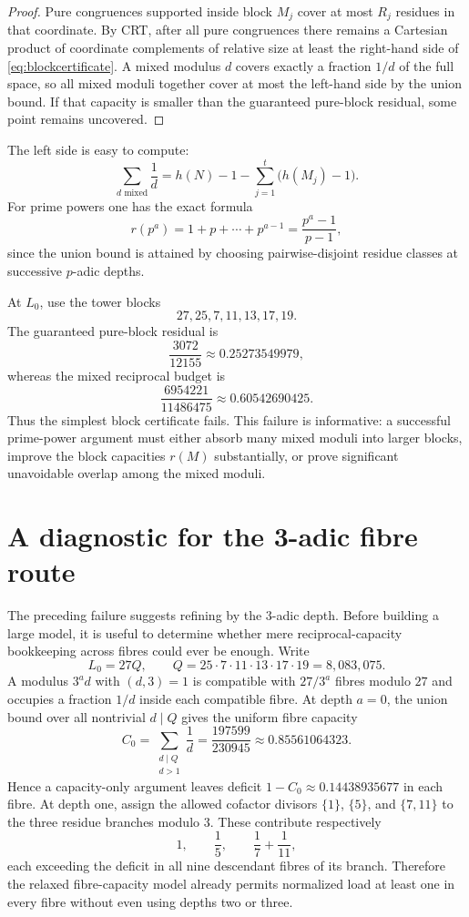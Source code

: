 \documentclass[11pt]{article}
\theoremstyle{definition}
\begin{document}
\begin{proof}
Pure congruences supported inside block $M_j$ cover at most $R_j$ residues in that coordinate.
By CRT, after all pure congruences there remains a Cartesian product of coordinate complements
of relative size at least the right-hand side of \eqref{eq:blockcertificate}.  A mixed modulus
$d$ covers exactly a fraction $1/d$ of the full space, so all mixed moduli together cover at
most the left-hand side by the union bound.  If that capacity is smaller than the guaranteed
pure-block residual, some point remains uncovered.
\end{proof}

The left side is easy to compute:
\[
 \sum_{d\text{ mixed}}\frac1d
 =h(N)-1-\sum_{j=1}^{t}\bigl(h(M_j)-1\bigr).
\]
For prime powers one has the exact formula
\[
 r(p^a)=1+p+\cdots+p^{a-1}=\frac{p^a-1}{p-1},
\]
since the union bound is attained by choosing pairwise-disjoint residue classes at successive
$p$-adic depths.

At $L_0$, use the tower blocks
\[
 27,25,7,11,13,17,19.
\]
The guaranteed pure-block residual is
\[
 \frac{3072}{12155}\approx0.25273549979,
\]
whereas the mixed reciprocal budget is
\[
 \frac{6954221}{11486475}\approx0.60542690425.
\]
Thus the simplest block certificate fails.  This failure is informative: a successful
prime-power argument must either absorb many mixed moduli into larger blocks, improve the
block capacities $r(M)$ substantially, or prove significant unavoidable overlap among the
mixed moduli.

\section{A diagnostic for the 3-adic fibre route}

The preceding failure suggests refining by the $3$-adic depth.  Before building a large model,
it is useful to determine whether mere reciprocal-capacity bookkeeping across fibres could ever
be enough.  Write
\[
 L_0=27Q,\qquad Q=25\cdot7\cdot11\cdot13\cdot17\cdot19=8{,}083{,}075.
\]
A modulus $3^a d$ with $(d,3)=1$ is compatible with $27/3^a$ fibres modulo $27$ and occupies a
fraction $1/d$ inside each compatible fibre.  At depth $a=0$, the union bound over all
nontrivial $d\mid Q$ gives the uniform fibre capacity
\[
 C_0=\sum_{\substack{d\mid Q\\d>1}}\frac1d
 =\frac{197599}{230945}\approx0.85561064323.
\]
Hence a capacity-only argument leaves deficit $1-C_0\approx0.14438935677$ in each fibre.
At depth one, assign the allowed cofactor divisors $\{1\}$, $\{5\}$, and $\{7,11\}$ to the
three residue branches modulo $3$.  These contribute respectively
\[
 1,\qquad \frac15,\qquad \frac17+\frac1{11},
\]
each exceeding the deficit in all nine descendant fibres of its branch.  Therefore the relaxed
fibre-capacity model already permits normalized load at least one in every fibre without even
using depths two or three.
\end{document}
